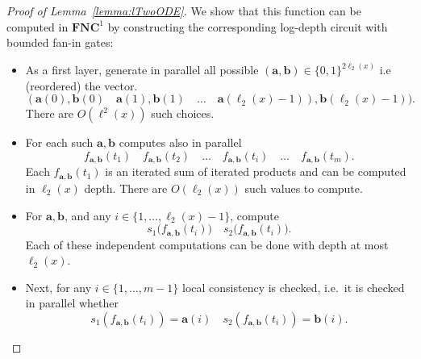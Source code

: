 \documentclass[11pt, oneside]{article}
\newenvironment{toappendix}{}{}
\newcommand{\NC}{\mathbf{FNC}}
\newcommand{\tu}[1]{\mathbf{#1}}
\theoremstyle{definition}
\begin{document}
\begin{toappendix}
\begin{proof}[Proof of Lemma~\ref{lemma:lTwoODE}]
    We show that this function can be computed in $\NC^1$ by constructing the corresponding log-depth circuit with bounded fan-in gates:
    \begin{itemize}
        \itemsep0em
        \item As a first layer, generate in parallel all possible $(\tu a,\tu b)\in \{0,1\}^{2\ell_2(x)}$ i.e (reordered) the vector.
        $$
            (\tu a(0), \tu b(0) \quad \tu a(1), \tu b(1) \quad \dots \quad \tu a(\ell_2(x)-1)), \tu b(\ell_2(x)-1)).
        $$
        There are $O(\ell^2(x))$ such choices.
        \item For each such $\tu a, \tu b$ computes also in parallel 
        $$
            f_{\tu a, \tu b}(t_1) \quad f_{\tu a, \tu b}(t_2) \quad \dots \quad f_{\tu a, \tu b}(t_i) \quad \dots \quad f_{\tu a, \tu b}(t_m).
        $$
        Each  $f_{\tu a, \tu b}(t_1) $ is an iterated sum of iterated products and can be computed in $\ell_2(x)$ depth. There are $O(\ell_2(x))$ such values to compute. 
        \item For $\tu a, \tu b$, and any $i\in \{1,\dots, \ell_2(x)-1\}$, compute
        $$
        s_1(f_{\tu a, \tu b}(t_i)\big) \quad s_2\big(f_{\tu a, \tu b}(t_i)\big).
        $$
        Each of these independent computations can be done with depth at most $\ell_2(x)$.
        \item Next, for any $i\in \{1,\dots, m-1\}$ local consistency is checked, i.e.~it is checked in parallel whether
        $$
        s_1(f_{\tu a, \tu b}(t_i)) = \tu a(i) \quad s_2(f_{\tu a, \tu b}(t_i)) = \tu b(i).
        $$

\end{itemize}
\end{proof}
\end{toappendix}
\end{document}
